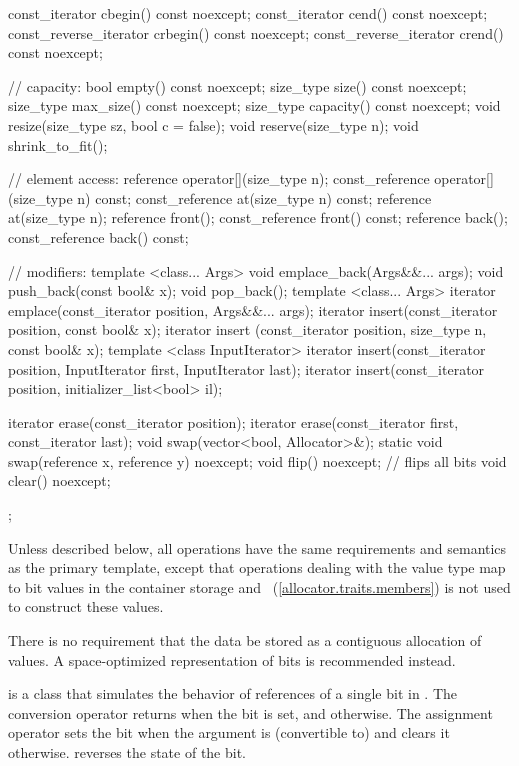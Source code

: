 \begin{codeblock}
{{    const_iterator         cbegin() const noexcept;
    const_iterator         cend() const noexcept;
    const_reverse_iterator crbegin() const noexcept;
    const_reverse_iterator crend() const noexcept;

    // capacity:
    bool      empty() const noexcept;
    size_type size() const noexcept;
    size_type max_size() const noexcept;
    size_type capacity() const noexcept;
    void      resize(size_type sz, bool c = false);
    void      reserve(size_type n);
    void      shrink_to_fit();

    // element access:
    reference       operator[](size_type n);
    const_reference operator[](size_type n) const;
    const_reference at(size_type n) const;
    reference       at(size_type n);
    reference       front();
    const_reference front() const;
    reference       back();
    const_reference back() const;

    // modifiers:
    template <class... Args> void emplace_back(Args&&... args);
    void push_back(const bool& x);
    void pop_back();
    template <class... Args> iterator emplace(const_iterator position, Args&&... args);
    iterator insert(const_iterator position, const bool& x);
    iterator insert (const_iterator position, size_type n, const bool& x);
    template <class InputIterator>
      iterator insert(const_iterator position,
                      InputIterator first, InputIterator last);
    iterator insert(const_iterator position, initializer_list<bool> il);

    iterator erase(const_iterator position);
    iterator erase(const_iterator first, const_iterator last);
    void swap(vector<bool, Allocator>&);
    static void swap(reference x, reference y) noexcept;
    void flip() noexcept;       // flips all bits
    void clear() noexcept;
  };
}
\end{codeblock}%

\pnum
Unless described below, all operations have the same requirements and
semantics as the primary  template, except that operations
dealing with the  value type map to bit values in the
container storage and
~(\ref{allocator.traits.members})
is not used to construct these values.

\pnum
There is no requirement that the data be stored as a contiguous allocation
of  values. A space-optimized representation of bits is
recommended instead.

\pnum
{}
is a class that simulates the behavior of references of a single bit in
. The conversion operator returns 
when the bit is set, and  otherwise. The assignment operator
sets the bit when the argument is (convertible to)  and
clears it otherwise.  reverses the state of the bit.

